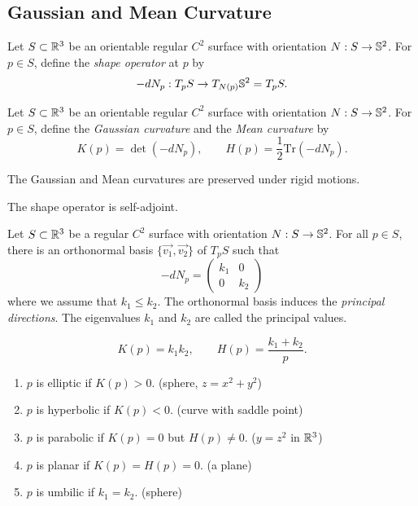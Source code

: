 \subsection{Gaussian and Mean Curvature}

\begin{definition}
    Let $S\subset \R^3$ be an orientable regular $C^2$ surface with orientation $N : S \to \S^2$. For $p \in S$, define the \textit{shape operator} at $p$ by
    $$-dN_p : T_p S \to T_{N(p)}\S^2 = T_p S.$$
\end{definition}

\begin{definition}
    Let $S\subset \R^3$ be an orientable regular $C^2$ surface with orientation $N : S \to \S^2$. For $p \in S$, define the \textit{Gaussian curvature} and the \textit{Mean curvature} by
    $$K(p) = \det(-dN_p), \qquad H(p) = \frac{1}{2}\text{Tr}(-dN_p).$$
\end{definition}

\begin{proposition}
    The Gaussian and Mean curvatures are preserved under rigid motions.
\end{proposition}

\begin{proposition}
    The shape operator is self-adjoint.
\end{proposition}

\begin{corollary}
    Let $S \subset \R^3$ be a regular $C^2$ surface with orientation $N : S \to \S^2$. For all $p\in S$, there is an orthonormal basis $\{\vec{v_1}, \vec{v_2}\}$ of $T_pS$ such that
    $$-dN_p = \begin{pmatrix} k_1 & 0 \\ 0 & k_2\end{pmatrix}$$
    where we assume that $k_1 \leq k_2$. The orthonormal basis induces the \textit{principal directions}. The eigenvalues $k_1$ and $k_2$ are called the principal values.
\end{corollary}

\begin{corollary}
    $$K(p) = k_1k_2, \qquad H(p) = \frac{k_1 + k_2}{p}.$$
\end{corollary}

\begin{definition}
    \begin{enumerate}
        \item $p$ is elliptic if $K(p) > 0$. (sphere, $z = x^2 + y^2$)
        \item $p$ is hyperbolic if $K(p)< 0$. (curve with saddle point)
        \item $p$ is parabolic if $K(p) = 0$ but $H(p) \neq 0$. ($y = z^2$ in $\R^3$)
        \item $p$ is planar if $K(p) = H(p) = 0$. (a plane)
        \item $p$ is umbilic if $k_1 = k_2$. (sphere)
    \end{enumerate}
\end{definition}


